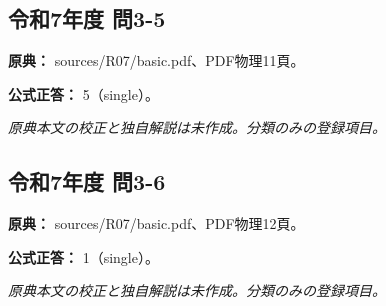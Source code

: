 \subsection{令和7年度 問3-5}
\label{q:r07-reg-basic-3-5}

\noindent\textbf{原典：} sources/R07/basic.pdf、PDF物理11頁。

\textbf{公式正答：} 5（single）。

\par\textit{原典本文の校正と独自解説は未作成。分類のみの登録項目。}

\subsection{令和7年度 問3-6}
\label{q:r07-reg-basic-3-6}

\noindent\textbf{原典：} sources/R07/basic.pdf、PDF物理12頁。

\textbf{公式正答：} 1（single）。

\par\textit{原典本文の校正と独自解説は未作成。分類のみの登録項目。}
